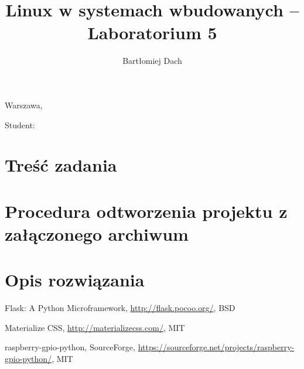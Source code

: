 \documentclass[10pt,a4paper]{article}
\title{Linux w systemach wbudowanych -- Laboratorium 5}
\author{Bartłomiej Dach}
\begin{document}
\makeatletter
\begin{flushright}
	Warszawa, \@date
\end{flushright}
\begin{center}
	\LARGE{\@title}
\end{center}
\vspace{0.25cm}
Student: \@author
\makeatother

\section{Treść zadania}

\section{Procedura odtworzenia projektu z załączonego archiwum}

\section{Opis rozwiązania}

\begin{thebibliography}{9}

	Flask: A Python Microframework,
		\url{http://flask.pocoo.org/},
		BSD

	Materialize CSS,
		\url{http://materializecss.com/},
		MIT

	raspberry-gpio-python,
		SourceForge,
		\url{https://sourceforge.net/projects/raspberry-gpio-python/},
		MIT

\end{thebibliography}
\end{document}
